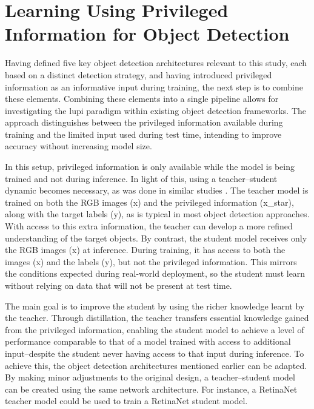 
\section{Learning Using Privileged Information for Object Detection}
\label{sec:4_lupi4od}

Having defined five key object detection architectures relevant to this study, each based on a distinct detection strategy, and having introduced privileged information as an informative input during training, the next step is to combine these elements. Combining these elements into a single pipeline allows for investigating the \gls{lupi} paradigm within existing object detection frameworks. The approach distinguishes between the privileged information available during training and the limited input used during test time, intending to improve accuracy without increasing model size.

In this setup, privileged information is only available while the model is being trained and not during inference. In light of this, using a teacher–student dynamic becomes necessary, as was done in similar studies \cite{lab2wild, lupi_classification}. The teacher model is trained on both the RGB images (\gls{x}) and the privileged information (\gls{x_star}), along with the target labels (\gls{y}), as is typical in most object detection approaches. With access to this extra information, the teacher can develop a more refined understanding of the target objects.
By contrast, the student model receives only the RGB images (\gls{x}) at inference. During training, it has access to both the images (\gls{x}) and the labels (\gls{y}), but not the privileged information. This mirrors the conditions expected during real-world deployment, so the student must learn without relying on data that will not be present at test time.

The main goal is to improve the student by using the richer knowledge learnt by the teacher. Through distillation, the teacher transfers essential knowledge gained from the privileged information, enabling the student model to achieve a level of performance comparable to that of a model trained with access to additional input--despite the student never having access to that input during inference.
To achieve this, the object detection architectures mentioned earlier can be adapted. By making minor adjustments to the original design, a teacher–student model can be created using the same network architecture. For instance, a RetinaNet teacher model could be used to train a RetinaNet student model.

